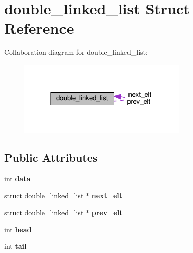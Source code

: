 \hypertarget{structdouble__linked__list}{}\section{double\+\_\+linked\+\_\+list Struct Reference}
\label{structdouble__linked__list}


Collaboration diagram for double\+\_\+linked\+\_\+list\+:
\nopagebreak
\begin{figure}[H]
\begin{center}
\leavevmode
\includegraphics[width=230pt]{structdouble__linked__list__coll__graph}
\end{center}
\end{figure}
\subsection*{Public Attributes}
\begin{DoxyCompactItemize}
\item 
\hypertarget{structdouble__linked__list_afe9a81833832bc231367943c5be265b4}{}int {\bfseries data}\label{structdouble__linked__list_afe9a81833832bc231367943c5be265b4}

\item 
\hypertarget{structdouble__linked__list_ac3a73b5622122a5e290108785397edbf}{}struct \hyperlink{structdouble__linked__list}{double\+\_\+linked\+\_\+list} $\ast$ {\bfseries next\+\_\+elt}\label{structdouble__linked__list_ac3a73b5622122a5e290108785397edbf}

\item 
\hypertarget{structdouble__linked__list_a94210e7b41640950a6e711611dd122f7}{}struct \hyperlink{structdouble__linked__list}{double\+\_\+linked\+\_\+list} $\ast$ {\bfseries prev\+\_\+elt}\label{structdouble__linked__list_a94210e7b41640950a6e711611dd122f7}

\item 
\hypertarget{structdouble__linked__list_ad819aa2c942c7a5fd12a6abbbd5fcee2}{}int {\bfseries head}\label{structdouble__linked__list_ad819aa2c942c7a5fd12a6abbbd5fcee2}

\item 
\hypertarget{structdouble__linked__list_a85a1b8b4f68f4e19d1336a62d3e32c5e}{}int {\bfseries tail}\label{structdouble__linked__list_a85a1b8b4f68f4e19d1336a62d3e32c5e}

\end{DoxyCompactItemize}


